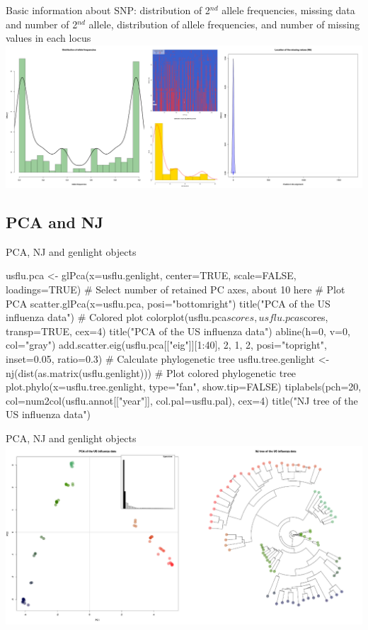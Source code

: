 \documentclass[compress, ucs, xelatex, 11pt, xcolor=svgnames,
  hyperref={
    bookmarks=true,
    unicode=true,
    colorlinks=true,
    pdftitle={Molecular data in R},
    plainpages=false,
    pdfauthor={Vojtech Zeisek},
    pdfsubject={Course about phylogeny and evolution in R},
    pdfcreator={XeLaTeX},
    pdfkeywords={R, evolution, phylogeny, molecular data},
    linkcolor=Tomato,
    anchorcolor=SaddleBrown,
    citecolor=Goldenrod,
    filecolor=DarkMagenta,
    menucolor=Sienna,
    urlcolor=DarkTurquoise,
    pdftex},
  url={hyphens, lowtilde} %
  ]{beamer}
\begin{document}
\begin{frame}{Basic information about SNP: distribution of 2$^{nd}$ allele frequencies, missing data and number of 2$^{nd}$ allele, distribution of allele frequencies, and number of missing values in each locus}
  \includegraphics[width=\textwidth]{flu_alleles.png}
\end{frame}

\subsection{PCA and NJ}

\begin{frame}[fragile]{PCA, NJ and genlight objects}
  \begin{spluscode}
    usflu.pca <- glPca(x=usflu.genlight, center=TRUE, scale=FALSE,
      loadings=TRUE) # Select number of retained PC axes, about 10 here
    # Plot PCA
    scatter.glPca(x=usflu.pca, posi="bottomright")
    title("PCA of the US influenza data")
    # Colored plot
    colorplot(usflu.pca$scores, usflu.pca$scores, transp=TRUE, cex=4)
    title("PCA of the US influenza data")
    abline(h=0, v=0, col="gray")
    add.scatter.eig(usflu.pca[["eig"]][1:40], 2, 1, 2, posi="topright",
      inset=0.05, ratio=0.3)
    # Calculate phylogenetic tree
    usflu.tree.genlight <- nj(dist(as.matrix(usflu.genlight)))
    # Plot colored phylogenetic tree
    plot.phylo(x=usflu.tree.genlight, type="fan", show.tip=FALSE)
    tiplabels(pch=20, col=num2col(usflu.annot[["year"]],
      col.pal=usflu.pal), cex=4)
    title("NJ tree of the US influenza data")
  \end{spluscode}
\end{frame}

\begin{frame}{PCA, NJ and genlight objects}
  \includegraphics[width=\textwidth]{flu_pcoa_nj.png}
\end{frame}
\end{document}
